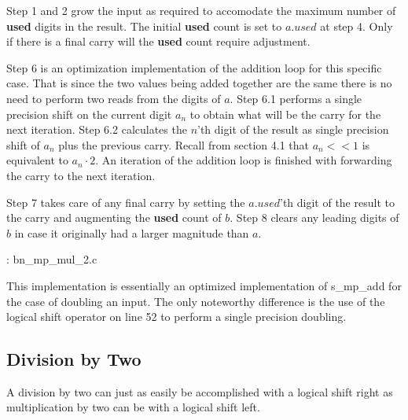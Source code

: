\documentclass[b5paper]{book}
\begin{document}
Step 1 and 2 grow the input as required to accomodate the maximum number of \textbf{used} digits in the result.  The initial \textbf{used} count
is set to $a.used$ at step 4.  Only if there is a final carry will the \textbf{used} count require adjustment.

Step 6 is an optimization implementation of the addition loop for this specific case.  That is since the two values being added together 
are the same there is no need to perform two reads from the digits of $a$.  Step 6.1 performs a single precision shift on the current digit $a_n$ to
obtain what will be the carry for the next iteration.  Step 6.2 calculates the $n$'th digit of the result as single precision shift of $a_n$ plus
the previous carry.  Recall from section 4.1 that $a_n << 1$ is equivalent to $a_n \cdot 2$.  An iteration of the addition loop is finished with 
forwarding the carry to the next iteration.

Step 7 takes care of any final carry by setting the $a.used$'th digit of the result to the carry and augmenting the \textbf{used} count of $b$.  
Step 8 clears any leading digits of $b$ in case it originally had a larger magnitude than $a$.

\vspace{+3mm}\begin{small}
\hspace{-5.1mm}{\bf File}: bn\_mp\_mul\_2.c
\vspace{-3mm}
\begin{alltt}
\end{alltt}
\end{small}

This implementation is essentially an optimized implementation of s\_mp\_add for the case of doubling an input.  The only noteworthy difference
is the use of the logical shift operator on line 52 to perform a single precision doubling.  

\subsection{Division by Two}
A division by two can just as easily be accomplished with a logical shift right as multiplication by two can be with a logical shift left.
\end{document}
